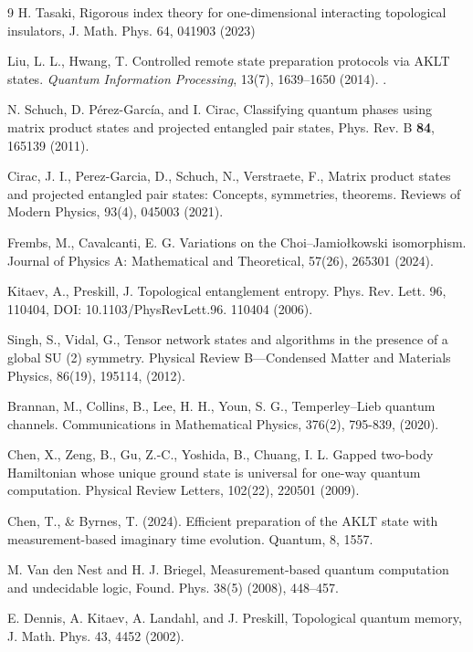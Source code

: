 \documentclass[12pt,a4paper]{article}
\begin{document}
\begin{thebibliography}{9}
 H. Tasaki, Rigorous index theory for one-dimensional interacting topological insulators, J. Math. Phys. 64, 041903 (2023)


 Liu, L. L.,   Hwang, T. Controlled remote state preparation protocols via AKLT states. \textit{Quantum Information Processing}, 13(7), 1639–1650 (2014). .

 N. Schuch, D. Pérez-García, and I. Cirac,  Classifying quantum phases using matrix product states and projected entangled pair states, Phys. Rev. B \textbf{84}, 165139 (2011).


 Cirac, J. I., Perez-Garcia, D., Schuch, N.,   Verstraete, F., Matrix product states and projected entangled pair states: Concepts, symmetries, theorems. Reviews of Modern Physics, 93(4), 045003 (2021).

 Frembs, M.,  Cavalcanti, E. G.  Variations on the Choi–Jamiołkowski isomorphism. Journal of Physics A: Mathematical and Theoretical, 57(26), 265301 (2024).


 Kitaev, A.,  Preskill, J. Topological entanglement entropy. Phys. Rev. Lett. 96, 110404, DOI: 10.1103/PhysRevLett.96. 110404 (2006).


  Singh, S.,   Vidal, G., Tensor network states and algorithms in the presence of a global SU (2) symmetry. Physical Review B—Condensed Matter and Materials Physics, 86(19), 195114, (2012).

 Brannan, M., Collins, B., Lee, H. H., Youn, S. G., Temperley–Lieb quantum channels. Communications in Mathematical Physics, 376(2), 795-839, (2020).




 Chen, X., Zeng, B., Gu, Z.-C., Yoshida, B.,  Chuang, I. L. Gapped two-body Hamiltonian whose unique ground state is universal for one-way quantum computation. Physical Review Letters, 102(22), 220501  (2009).

 Chen, T., \& Byrnes, T. (2024). Efficient preparation of the AKLT state with measurement-based imaginary time evolution. Quantum, 8, 1557.


   M. Van den Nest and H. J. Briegel, Measurement-based quantum computation and undecidable logic, Found. Phys. 38(5) (2008), 448–457.


 E. Dennis, A. Kitaev, A. Landahl, and J. Preskill, Topological quantum memory, J. Math. Phys. 43, 4452 (2002).


\end{thebibliography}
\end{document}
